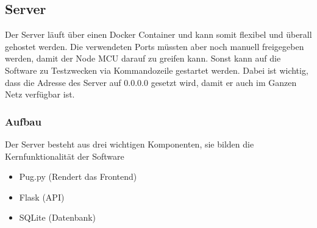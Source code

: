 \documentclass[../main.tex]{subfiles}
\begin{document}
\subsection{Server}

Der Server läuft über einen Docker Container und kann somit flexibel und überall gehostet werden. Die verwendeten Ports müssten aber noch manuell freigegeben werden, damit der Node MCU darauf zu greifen kann. Sonst kann auf die Software zu Testzwecken via Kommandozeile gestartet werden. Dabei ist wichtig, dass die Adresse des Server auf 0.0.0.0 gesetzt wird, damit er auch im Ganzen Netz verfügbar ist.

\subsubsection{Aufbau}

Der Server besteht aus drei wichtigen Komponenten, sie bilden die Kernfunktionalität der Software

\begin{itemize}
    \item Pug.py (Rendert das Frontend)
    \item Flask (API)
    \item SQLite (Datenbank)
\end{itemize}
\end{document}
